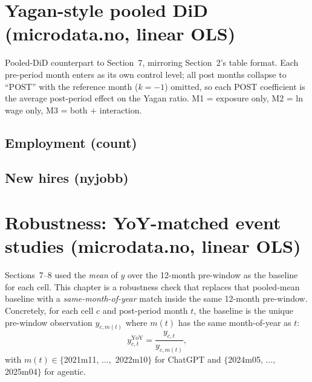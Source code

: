 \documentclass[11pt]{article}
\begin{document}
\clearpage
\section{Yagan-style pooled DiD (microdata.no, linear OLS)}

\noindent
Pooled-DiD counterpart to Section~7, mirroring Section~2's table format.
Each pre-period month enters as its own control level; all post months
collapse to ``POST'' with the reference month ($k=-1$) omitted, so each
POST coefficient is the average post-period effect on the Yagan ratio.
M1 = exposure only, M2 = ln wage only, M3 = both $+$ interaction.

\subsection{Employment (count)}


\clearpage
\subsection{New hires (nyjobb)}


\clearpage
\section{Robustness: YoY-matched event studies (microdata.no, linear OLS)}

\noindent
Sections~7--8 used the \emph{mean} of $y$ over the 12-month pre-window as
the baseline for each cell. This chapter is a robustness check that
replaces that pooled-mean baseline with a \emph{same-month-of-year}
match inside the same 12-month pre-window. Concretely, for each
cell $c$ and post-period month $t$, the baseline is the unique
pre-window observation $y_{c, m(t)}$ where $m(t)$ has the same
month-of-year as $t$:
\begin{equation*}
  y^{\mathrm{YoY}}_{c,t}=\frac{y_{c,t}}{y_{c, m(t)}},
\end{equation*}
with $m(t)\in\{$2021m11, $\ldots,$ 2022m10$\}$ for ChatGPT and
$\{$2024m05, $\ldots,$ 2025m04$\}$ for agentic.
\medskip
\end{document}
